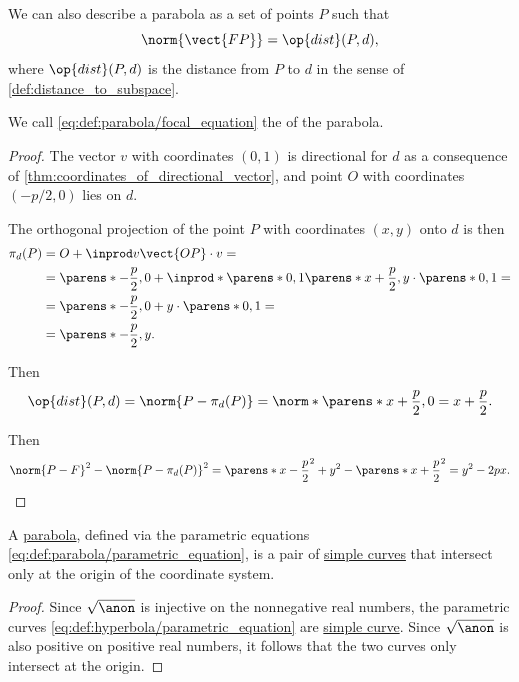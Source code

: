 \begin{definition}
\begin{thmenum}
     We can also describe a parabola as a set of points \( P \) such that
    \begin{equation}\label{eq:def:parabola/focal_equation}
      \norm{\vect{FP}} = \op{dist}(P, d),
    \end{equation}
    where \( \op{dist}(P, d) \) is the distance from \( P \) to \( d \) in the sense of \cref{def:distance_to_subspace}.

    We call \eqref{eq:def:parabola/focal_equation} the  of the parabola.
  \end{thmenum}
\end{definition}
\begin{proof}
   The vector \( v \) with coordinates \( (0, 1) \) is directional for \( d \) as a consequence of \cref{thm:coordinates_of_directional_vector}, and point \( O \) with coordinates \( (-p / 2, 0) \) lies on \( d \).

  The orthogonal projection of the point \( P \) with coordinates \( (x, y) \) onto \( d \) is then
  \begin{align*}
    \pi_d(P)
    &=
    O + \inprod v {\vect{OP}} \cdot v
    = \\ &=
    \parens*{ -\frac p 2, 0 } + \inprod*{ \parens*{ 0, 1 } } { \parens*{ x + \frac p 2, y } } \cdot \parens*{ 0, 1 }
    = \\ &=
    \parens*{ -\frac p 2, 0 } + y \cdot \parens*{ 0, 1 }
    = \\ &=
    \parens*{ -\frac p 2, y }.
  \end{align*}

  Then
  \begin{equation*}
    \op{dist}(P, d)
    =
    \norm{P - \pi_d(P)}
    =
    \norm*{\parens*{ x + \frac p 2, 0 }}
    =
    x + \frac p 2.
  \end{equation*}

  Then
  \begin{equation*}
    \norm{P - F}^2 - \norm{P - \pi_d(P)}^2
    =
    \parens*{ x - \frac p 2 }^2 + y^2 - \parens*{ x + \frac p 2 }^2
    =
    y^2 - 2px.
  \end{equation*}
\end{proof}

\begin{proposition}\label{thm:parabola_is_closed_simple_curve}
  A \hyperref[def:parabola]{parabola}, defined via the parametric equations \eqref{eq:def:parabola/parametric_equation}, is a pair of \hyperref[def:simple_curve]{simple curves} that intersect only at the origin of the coordinate system.
\end{proposition}
\begin{proof}
  Since \( \sqrt {\anon} \) is injective on the nonnegative real numbers, the parametric curves \eqref{eq:def:hyperbola/parametric_equation} are \hyperref[def:simple_curve]{simple curve}. Since \( \sqrt {\anon} \) is also positive on positive real numbers, it follows that the two curves only intersect at the origin.
\end{proof}

